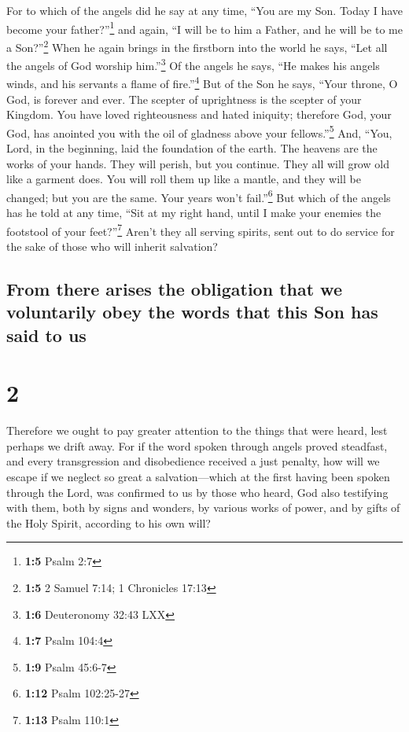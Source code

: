  For to which of the angels did he say at any time, ``You
are my Son. Today I have become your father?''\footnote{\textbf{1:5}
  Psalm 2:7} and again, ``I will be to him a Father, and he will be to
me a Son?''\footnote{\textbf{1:5} 2 Samuel 7:14; 1 Chronicles 17:13}
 When he again brings in the firstborn into the world he
says, ``Let all the angels of God worship him.''\footnote{\textbf{1:6}
  Deuteronomy 32:43 LXX}  Of the angels he says, ``He
makes his angels winds, and his servants a flame of fire.''\footnote{\textbf{1:7}
  Psalm 104:4}  But of the Son he says, ``Your throne, O
God, is forever and ever. The scepter of uprightness is the scepter of
your Kingdom.  You have loved righteousness and hated
iniquity; therefore God, your God, has anointed you with the oil of
gladness above your fellows.''\footnote{\textbf{1:9} Psalm 45:6-7}
 And, ``You, Lord, in the beginning, laid the foundation
of the earth. The heavens are the works of your hands. 
They will perish, but you continue. They all will grow old like a
garment does.  You will roll them up like a mantle, and
they will be changed; but you are the same. Your years won't
fail.''\footnote{\textbf{1:12} Psalm 102:25-27}  But
which of the angels has he told at any time, ``Sit at my right hand,
until I make your enemies the footstool of your feet?''\footnote{\textbf{1:13}
  Psalm 110:1}  Aren't they all serving spirits, sent out
to do service for the sake of those who will inherit salvation?

\hypertarget{from-there-arises-the-obligation-that-we-voluntarily-obey-the-words-that-this-son-has-said-to-us}{%
\subsection{From there arises the obligation that we voluntarily obey
the words that this Son has said to
us}\label{from-there-arises-the-obligation-that-we-voluntarily-obey-the-words-that-this-son-has-said-to-us}}

\hypertarget{section-1}{%
\section{2}\label{section-1}}

 Therefore we ought to pay greater attention to the things
that were heard, lest perhaps we drift away.  For if the
word spoken through angels proved steadfast, and every transgression and
disobedience received a just penalty,  how will we escape
if we neglect so great a salvation---which at the first having been
spoken through the Lord, was confirmed to us by those who heard,
 God also testifying with them, both by signs and wonders,
by various works of power, and by gifts of the Holy Spirit, according to
his own will?

